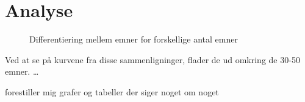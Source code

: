 \part{Analyse}\label{part:analysis}

\begin{figure}[H]
\centering

\caption{Differentiering mellem emner for forskellige antal emner}
\end{figure}

Ved at se på kurvene fra disse sammenligninger, flader de ud omkring de 30-50 emner.
\ldots

forestiller mig grafer og tabeller der siger noget om noget
